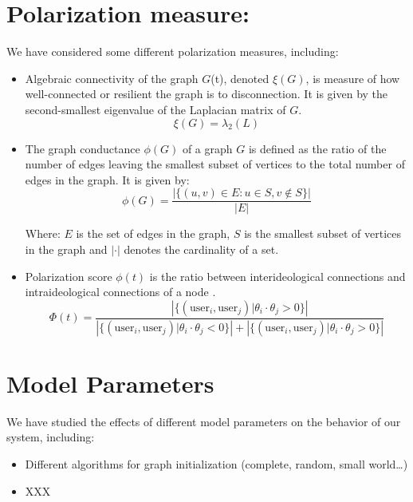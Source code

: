 \documentclass[12pt]{report} %
\begin{document}
\section{Polarization measure:}

We have considered some different polarization measures, including:

\begin{itemize}
    \item Algebraic connectivity of the graph $G$(t), denoted $\xi(G)$, is measure of how well-connected or resilient the graph is to disconnection. It is given by the second-smallest eigenvalue of the Laplacian matrix of $G$.
        \begin{equation*}
            \xi(G) = \lambda_2(L)
        \end{equation*}

    \item The graph conductance $\phi(G)$ of a graph $G$ is defined as the ratio of the number of edges leaving the smallest subset of vertices to the total number of edges in the graph. It is given by:
        \[
        \phi(G) = \frac{| \{ (u,v) \in E : u \in S, v \notin S \} |}{| E |}
        \]
        
        Where: $E$ is the set of edges in the graph, $S$ is the smallest subset of vertices in the graph and $| \cdot |$ denotes the cardinality of a set.
        
    \item Polarization score $\phi(t)$ is the ratio between interideological connections and intraideological connections of a node \cite{polarization}.
    \begin{equation*}
        \Phi(t) = \frac{\left|\{(\text{user}_i, \text{user}_j) | \theta_i \cdot \theta_j > 0\}\right|}{\left|\{(\text{user}_i, \text{user}_j) | \theta_i \cdot \theta_j < 0\}\right| + \left|\{(\text{user}_i, \text{user}_j) | \theta_i \cdot \theta_j > 0\}\right|}
    \end{equation*}
\end{itemize}

\section{Model Parameters}

We have studied the effects of different model parameters on the behavior of our system, including:

\begin{itemize}
    \item Different algorithms for graph initialization (complete, random, small world…)
    \item XXX
\end{itemize}
\end{document}
